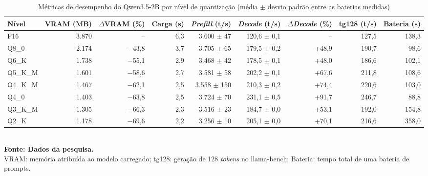\begin{table}[htb]
\centering
\caption{Métricas de desempenho do Qwen3.5-2B por nível de quantização (média $\pm$ desvio padrão entre as baterias medidas)}
\label{tab:desempenho-Qwen3.5-2B}
\small
\begin{tabular}{lrrrrrrrr}
\hline
\textbf{Nível} & \textbf{VRAM (MB)} & \textbf{$\Delta$VRAM (\%)} & \textbf{Carga (s)} & \textbf{\textit{Prefill} (t/s)} & \textbf{\textit{Decode} (t/s)} & \textbf{$\Delta$\textit{Decode} (\%)} & \textbf{tg128 (t/s)} & \textbf{Bateria (s)} \\
\hline
F16 & 3.870 & -- & 6,3 & 3.600 $\pm$ 47 & 120,6 $\pm$ 0,1 & -- & 127,5 & 138,3 \\
Q8\_0 & 2.174 & $-$43,8 & 3,7 & 3.705 $\pm$ 65 & 179,5 $\pm$ 0,2 & +48,9 & 190,7 & 98,6 \\
Q6\_K & 1.738 & $-$55,1 & 2,9 & 3.468 $\pm$ 42 & 178,5 $\pm$ 0,1 & +48,0 & 186,6 & 102,1 \\
Q5\_K\_M & 1.601 & $-$58,6 & 2,7 & 3.581 $\pm$ 58 & 202,2 $\pm$ 0,1 & +67,6 & 211,8 & 108,6 \\
Q4\_K\_M & 1.467 & $-$62,1 & 2,5 & 3.558 $\pm$ 150 & 210,3 $\pm$ 0,2 & +74,4 & 220,6 & 103,0 \\
Q4\_0 & 1.403 & $-$63,8 & 2,5 & 3.724 $\pm$ 70 & 231,1 $\pm$ 0,5 & +91,7 & 246,7 & 88,8 \\
Q3\_K\_M & 1.305 & $-$66,3 & 2,3 & 3.516 $\pm$ 23 & 184,7 $\pm$ 0,0 & +53,1 & 192,0 & 154,8 \\
Q2\_K & 1.178 & $-$69,6 & 2,2 & 3.256 $\pm$ 10 & 205,1 $\pm$ 0,0 & +70,1 & 216,6 & 358,0 \\
\hline
\end{tabular}
\\[2pt]{\footnotesize \textbf{Fonte: Dados da pesquisa.}}
\\[2pt]{\footnotesize VRAM: memória atribuída ao modelo carregado; tg128: geração de 128 \textit{tokens} no llama-bench; Bateria: tempo total de uma bateria de prompts.}
\end{table}
